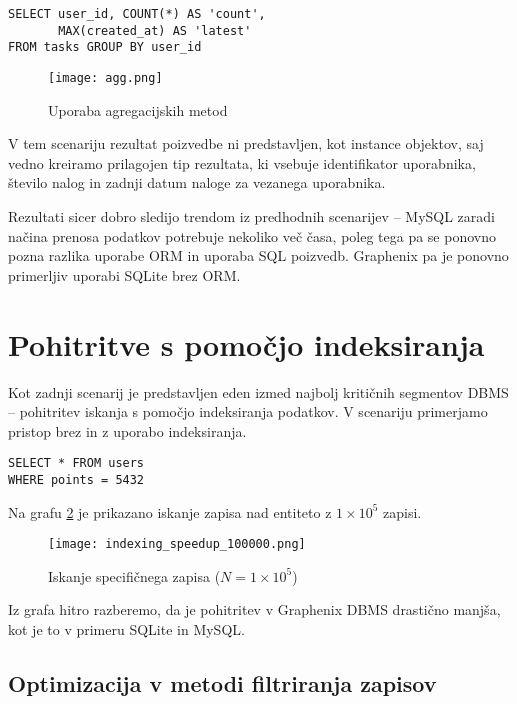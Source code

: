 \documentclass[a4paper,12pt,openright]{book}
\begin{document}
\begin{verbatim}
SELECT user_id, COUNT(*) AS 'count', 
       MAX(created_at) AS 'latest' 
FROM tasks GROUP BY user_id
\end{verbatim}

    \begin{figure}[H]
        \centerline{\texttt{[image: agg.png]}}
        \caption{Uporaba agregacijskih metod}
        \label{agg}
    \end{figure}

    \noindent
    V tem scenariju rezultat poizvedbe ni predstavljen, kot instance objektov, saj vedno kreiramo prilagojen tip rezultata, ki vsebuje identifikator uporabnika, število nalog in zadnji datum naloge za vezanega uporabnika.

    Rezultati sicer dobro sledijo trendom iz predhodnih scenarijev – MySQL zaradi načina prenosa podatkov potrebuje nekoliko več časa, poleg tega pa se ponovno pozna razlika uporabe ORM in uporaba SQL poizvedb. Graphenix pa je ponovno primerljiv uporabi SQLite brez ORM.

    \section{Pohitritve s pomočjo indeksiranja}

    Kot zadnji scenarij je predstavljen eden izmed najbolj kritičnih segmentov DBMS – pohitritev iskanja s pomočjo indeksiranja podatkov. V scenariju primerjamo pristop brez in z uporabo indeksiranja.
    
\begin{verbatim}
SELECT * FROM users
WHERE points = 5432
\end{verbatim}

    \noindent
    Na grafu \ref{old_speedup} je prikazano iskanje zapisa nad entiteto z $ 1 \times 10^5$ zapisi.

    \begin{figure}[H]
        \centerline{\texttt{[image: indexing\_speedup\_100000.png]}}
        \caption{Iskanje specifičnega zapisa ($N = 1 \times 10^5$)}
        \label{old_speedup}
    \end{figure}

    \noindent
    Iz grafa hitro razberemo, da je pohitritev v Graphenix DBMS drastično manjša, kot je to v primeru SQLite in MySQL.

    \subsection{Optimizacija v metodi filtriranja zapisov}
\end{document}
